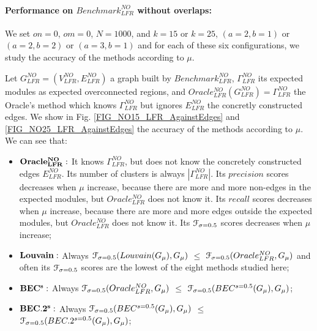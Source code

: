 \documentclass[12pt]{article}
\theoremstyle{thmstyleone}%
\theoremstyle{definition}
\begin{document}
\paragraph{Performance on $Benchmark^{NO}_{LFR}$ without overlaps: \label{PerfBenchLFRWout}}

We set $on=0$, $om=0$, $N=1000$, and $k=15$ or $k=25$, $(a=2, b=1)$ or $(a=2, b=2)$ or $(a=3, b=1)$
and for each of these six configurations, we study the accuracy of the methods according to $\mu$.

\vspace{0.20cm}
\noindent
Let $G^{NO}_{LFR}=(V^{NO}_{LFR},E^{NO}_{LFR})$ a graph built by $Benchmark^{NO}_{LFR}$,
$\Gamma^{NO}_{LFR}$ its expected modules as expected overconnected regions,
and $Oracle^{NO}_{LFR}(G^{NO}_{LFR})=\Gamma^{NO}_{LFR}$ the Oracle's method which knows $\Gamma^{NO}_{LFR}$ but ignores $E^{NO}_{LFR}$ the concretly constructed edges.
%
We show in Fig. \ref{FIG_NO15_LFR_AgainstEdges} and \ref{FIG_NO25_LFR_AgainstEdges} the accuracy of the methods according to $\mu$.
We can see that:

\begin{itemize}

    \item $\bf Oracle^{NO}_{LFR}:$ It knows $\Gamma^{NO}_{LFR}$, but does not know the concretely constructed edges $E^{NO}_{LFR}$.
    Its number of clusters is always $|\Gamma^{NO}_{LFR}|$.
    Its $precision$ scores decreases when $\mu$ increase, because there are more and more non-edges in the expected modules, but $Oracle^{NO}_{LFR}$ does not know it.
    Its $recall$ scores decreases when $\mu$ increase, because there are more and more edges outside the expected modules, but $Oracle^{NO}_{LFR}$ does not know it.
    Its $\EuScript{F}_{\sigma=0.5}$ scores decreases when $\mu$ increase;

    \item $\bf Louvain:$ Always $\EuScript{F}_{\sigma=0.5}(Louvain(G_{\mu}), G_{\mu})$ $\leqslant$ $\EuScript{F}_{\sigma=0.5}(Oracle^{NO}_{LFR},G_{\mu})$ and often its $\EuScript{F}_{\sigma=0.5}$ scores are the lowest of the eight methods studied here;

    \item $\bf BEC^{s}:$ Always $\EuScript{F}_{\sigma=0.5}(Oracle^{NO}_{LFR},G_{\mu})$ $\leqslant$ $\EuScript{F}_{\sigma=0.5}(BEC^{s=0.5}(G_{\mu}), G_{\mu})$;

    \item $\bf BEC.2^{s}:$ Always $\EuScript{F}_{\sigma=0.5}(BEC^{s=0.5}(G_{\mu}), G_{\mu})$ $\leqslant$ $\EuScript{F}_{\sigma=0.5}(BEC.2^{s=0.5}(G_{\mu}), G_{\mu})$;

\end{itemize}
\end{document}
